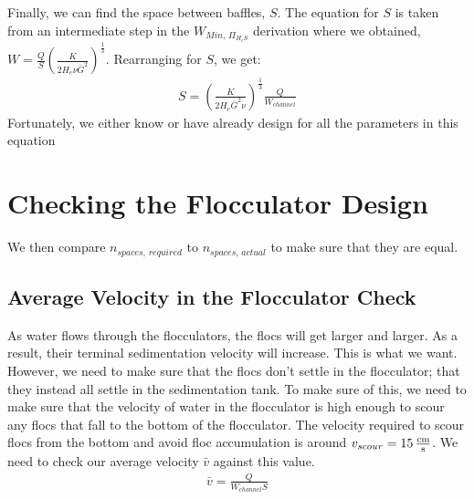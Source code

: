 \documentclass[letterpaper,10pt,english]{sphinxmanual}
\begin{document}
{\subsubsection{}
\label{\detokenize{Flocculation/Floc_Design:baffle-spacing-math-s}}
Finally, we can find the space between baffles, \(S\). The equation for \(S\) is taken from an intermediate step in the \(W_{Min, \, \Pi_{H_eS}}\) derivation where we obtained, \(W = \frac{Q}{S}\left( \frac{K}{2 H_e \nu \bar G^2} \right)^\frac{1}{3}\). Rearranging for \(S\), we get:
\begin{equation}\label{equation:Flocculation/Floc_Design:Flocculation/Floc_Design:29}
\begin{split}S = \left( \frac{K}{2 H_e \bar G^2 \nu } \right)^\frac{1}{3} \frac{Q}{W_{channel}}\end{split}
\end{equation}
Fortunately, we either know or have already design for all the parameters in this equation


\section{Checking the Flocculator Design}
\label{\detokenize{Flocculation/Floc_Design:checking-the-flocculator-design}}
We then compare \(n_{spaces, \, required}\) to \(n_{spaces, \, actual}\) to make sure that they are equal.


\subsection{Average Velocity in the Flocculator Check}
\label{\detokenize{Flocculation/Floc_Design:average-velocity-in-the-flocculator-check}}
As water flows through the flocculators, the flocs will get larger and larger. As a result, their terminal sedimentation velocity will increase. This is what we want. However, we need to make sure that the flocs don’t settle in the flocculator; that they instead all settle in the sedimentation tank. To make sure of this, we need to make sure that the velocity of water in the flocculator is high enough to scour any flocs that fall to the bottom of the flocculator. The velocity required to scour flocs from the bottom and avoid floc accumulation is around \(v_{scour} = 15 \, {\rm \frac{cm}{s}}\). We need to check our average velocity \(\bar v\) against this value.
\begin{equation}\label{equation:Flocculation/Floc_Design:Flocculation/Floc_Design:30}
\begin{split}\bar v = \frac{Q}{W_{channel} S}\end{split}
\end{equation}

}
\end{document}
